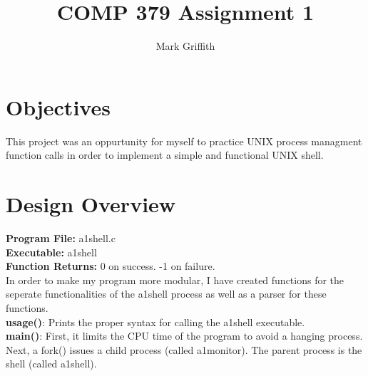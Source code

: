 \documentclass{article}
\begin{document}
\title{COMP 379 Assignment 1}
\author{Mark Griffith}

\maketitle

\section{Objectives}
This project was an oppurtunity for myself to practice UNIX process managment function calls
in order to implement a simple and functional UNIX shell.


\section{Design Overview}
\textbf{Program File:} a1shell.c \\
\textbf{Executable:} a1shell \\
\textbf{Function Returns:} 0 on success. -1 on failure. \\

\noindent
In order to make my program more modular, I have created functions
for the seperate functionalities of the a1shell process as well as
a parser for these functions. \\

\noindent
\textbf{usage()}: Prints the proper syntax for calling the a1shell executable. \\

\noindent
\textbf{main()}: First, it limits the CPU time of the program to avoid a hanging
process.
Next, a fork() issues a child process (called a1monitor). The parent process is the
shell (called a1shell). \\
\end{document}
